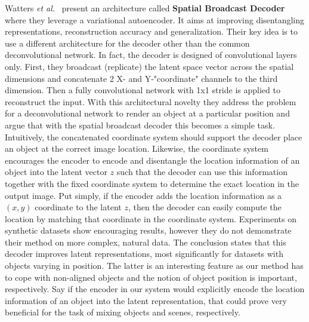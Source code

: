 \documentclass[12pt,a4paper]{article}
\begin{document}
\par Watters \textit{et al.}~\cite{SpatialBDecoder} present an architecture called \textbf{Spatial Broadcast Decoder} where they leverage a variational autoencoder. It aims at improving disentangling representations, reconstruction accuracy and generalization. Their key idea is to use a different architecture for the decoder other than the common deconvolutional network. In fact, the decoder is designed of convolutional layers only. First, they broadcast (replicate) the latent space vector across the spatial dimensions and concatenate 2 X- and Y-"coordinate" channels to the third dimension. Then a fully convolutional network with 1x1 stride is applied to reconstruct the input. With this architectural novelty they address the problem for a deconvolutional network to render an object at a particular position and argue that with the spatial broadcast decoder this becomes a simple task. Intuitively, the concatenated coordinate system should support the decoder place an object at the correct image location. Likewise, the coordinate system encourages the encoder to encode and disentangle the location information of an object into the latent vector $z$ such that the decoder can use this information together with the fixed coordinate system to determine the exact location in the output image. Put simply, if the encoder adds the location information as a $(x,y)$ coordinate to the latent $z$, then the decoder can easily compute the location by matching that coordinate in the coordinate system. Experiments on synthetic datasets show encouraging results, however they do not demonstrate their method on more complex, natural data. The conclusion states that this decoder improves latent representations, most significantly for datasets with objects varying in position. The latter is an interesting feature as our method has to cope with non-aligned objects and the notion of object position is important, respectively. Say if the encoder in our system would explicitly encode the location information of an object into the latent representation, that could prove very beneficial for the task of mixing objects and scenes, respectively.
\end{document}

